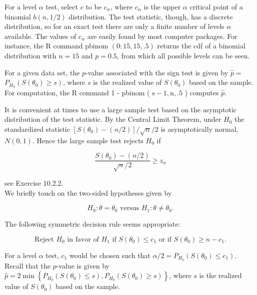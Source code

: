 For a level $\alpha$ test, select $c$ to be $c_{\alpha}$, where $c_{\alpha}$ is the upper $\alpha$ critical point of a binomial $b(n, 1 / 2)$ distribution. The test statistic, though, has a discrete distribution, so for an exact test there are only a finite number of levels $\alpha$ available. The values of $c_{\alpha}$ are easily found by most computer packages. For instance, the R command pbinom $(0: 15,15, .5)$ returns the cdf of a binomial distribution with $n=15$ and $p=0.5$, from which all possible levels can be seen.

For a given data set, the $p$-value associated with the sign test is given by $\widehat{p}=$ $P_{H_{0}}\left(S\left(\theta_{0}\right) \geq s\right)$, where $s$ is the realized value of $S\left(\theta_{0}\right)$ based on the sample. For computation, the R command 1 - pbinom ( $\mathrm{s}-1, \mathrm{n}, .5$ ) computes $\widehat{p}$.

It is convenient at times to use a large sample test based on the asymptotic distribution of the test statistic. By the Central Limit Theorem, under $H_{0}$ the standardized statistic $\left[S\left(\theta_{0}\right)-(n / 2)\right] / \sqrt{n} / 2$ is asymptotically normal, $N(0,1)$. Hence the large sample test rejects $H_{0}$ if


\begin{equation*}
\frac{S\left(\theta_{0}\right)-(n / 2)}{\sqrt{n} / 2} \geq z_{\alpha} \tag{10.2.6}
\end{equation*}


see Exercise 10.2.2.\\
We briefly touch on the two-sided hypotheses given by


\begin{equation*}
H_{0}: \theta=\theta_{0} \text { versus } H_{1}: \theta \neq \theta_{0} . \tag{10.2.7}
\end{equation*}


The following symmetric decision rule seems appropriate:


\begin{equation*}
\text { Reject } H_{0} \text { in favor of } H_{1} \text { if } S\left(\theta_{0}\right) \leq c_{1} \text { or if } S\left(\theta_{0}\right) \geq n-c_{1} \text {. } \tag{10.2.8}
\end{equation*}


For a level $\alpha$ test, $c_{1}$ would be chosen such that $\alpha / 2=P_{H_{0}}\left(S\left(\theta_{0}\right) \leq c_{1}\right)$. Recall that the $p$-value is given by $\widehat{p}=2 \min \left\{P_{H_{0}}\left(S\left(\theta_{0}\right) \leq s\right), P_{H_{0}}\left(S\left(\theta_{0}\right) \geq s\right)\right\}$, where $s$ is the realized value of $S\left(\theta_{0}\right)$ based on the sample.

